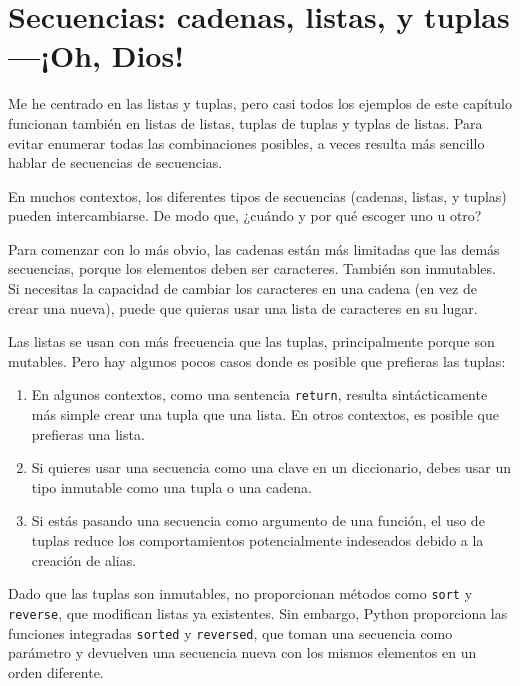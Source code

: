 \section{Secuencias: cadenas, listas, y tuplas---¡Oh, Dios!}

Me he centrado en las listas y tuplas, pero casi todos los ejemplos de
este capítulo funcionan también en listas de listas, tuplas de tuplas y
typlas de listas. Para evitar enumerar todas las combinaciones posibles,
a veces resulta más sencillo hablar de secuencias de secuencias.

En muchos contextos, los diferentes tipos de secuencias (cadenas, listas, y
tuplas) pueden intercambiarse. De modo que, ¿cuándo y por qué escoger uno
u otro?


Para comenzar con lo más obvio, las cadenas están más limitadas que las demás
secuencias, porque los elementos deben ser caracteres. También son
inmutables. Si necesitas la capacidad de cambiar los caracteres
en una cadena (en vez de crear una nueva), puede que
quieras usar una lista de caracteres en su lugar.

Las listas se usan con más frecuencia que las tuplas, principalmente porque son mutables.
Pero hay algunos pocos casos donde es posible que prefieras las tuplas:

\begin{enumerate}

\item En algunos contextos, como una sentencia {\tt return}, resulta
sintácticamente más simple crear una tupla que una lista. En otros
contextos, es posible que prefieras una lista.

\item Si quieres usar una secuencia como una clave en un diccionario,
debes usar un tipo inmutable como una tupla o una cadena.

\item Si estás pasando una secuencia como argumento de una función,
el uso de tuplas reduce los comportamientos potencialmente indeseados
debido a la creación de alias.

\end{enumerate}

Dado que las tuplas son inmutables, no proporcionan métodos
como {\tt sort} y {\tt reverse}, que modifican listas ya existentes.
Sin embargo, Python proporciona las funciones integradas {\tt sorted}
y {\tt reversed}, que toman una secuencia como parámetro
y devuelven una secuencia nueva con los mismos elementos en un
orden diferente.


